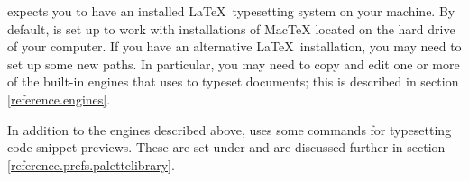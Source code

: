 \texnicle expects you to have an installed \LaTeX\ typesetting system on your machine. By default, \texnicle is set up to work with installations of MacTeX located on the hard drive of your computer. If you have an alternative \LaTeX\ installation, you may need to set up some new paths. In particular, you may need to copy and edit one or more of the built-in engines that \texnicle uses to typeset documents; this is described in section \ref{reference.engines}.


In addition to the engines described above, \texnicle uses some commands for typesetting code snippet previews. These are set under  and are discussed further in section \ref{reference.prefs.palettelibrary}.